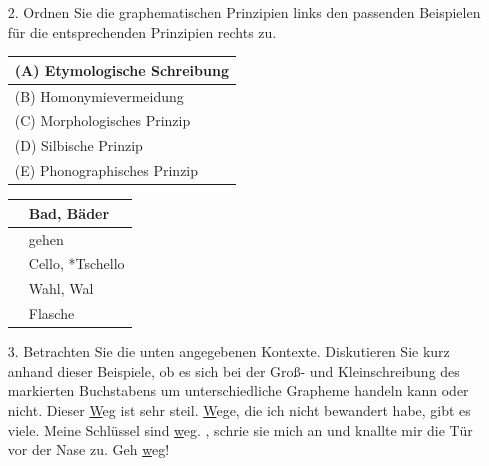 {\begin{frame}
	\begin{itemize}
		\item[2.] Ordnen Sie die graphematischen Prinzipien links den passenden Beispielen für die entsprechenden Prinzipien rechts zu.
		\begin{table}[h!]
			\begin{minipage}{0.45\textwidth}
				\centering
				\begin{tabular}{|l|}
					\hline
					(A) Etymologische Schreibung\\
					\hline
					(B) Homonymievermeidung\\
					\hline
					(C) Morphologisches Prinzip\\
					\hline
					(D) Silbische Prinzip\\
					\hline
					(E) Phonographisches Prinzip\\
					\hline
				\end{tabular}
			\end{minipage}\hfill%
			\begin{minipage}{0.45\textwidth}
				\centering
				\begin{tabular}{|p{}|l|}
					\hline
					& Bad, Bäder \\
					\hline
					& gehen \\
					\hline
					& Cello, *Tschello \\
					\hline
					& Wahl, Wal\\
					\hline
					& Flasche \\
					\hline
				\end{tabular}
			\end{minipage}
		\end{table}
	\end{itemize}
\end{frame}

\begin{frame}
	\begin{itemize}
		\item[3.] Betrachten Sie die unten angegebenen Kontexte. Diskutieren Sie kurz anhand dieser Beispiele, ob es sich bei der Groß- und Kleinschreibung des markierten Buchstabens um unterschiedliche Grapheme handeln kann oder nicht.
\eal
			\ex Dieser \underline{W}eg ist sehr steil.
			\ex \underline{W}ege, die ich nicht bewandert habe, gibt es viele.
			\ex Meine Schlüssel sind \underline{w}eg.
			\ex {}, schrie sie mich an und knallte mir die Tür vor der Nase zu.
			\ex Geh \underline{w}eg!
\zl
	\end{itemize}
\end{frame}

}
